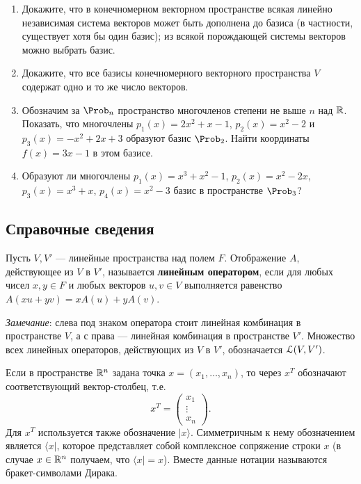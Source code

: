 \begin{enumerate}
\item Докажите, что в конечномерном векторном пространстве
\ipunkt всякая линейно независимая система векторов может быть дополнена до базиса (в частности,
существует хотя бы один базис);
\ipunkt из всякой порождающей системы векторов можно выбрать базис.

\item Докажите, что все базисы конечномерного векторного пространства $V$ содержат одно и
то же число векторов.

\item Обозначим за $\P_n$ пространство многочленов степени не выше $n$ над $\mathbb R$.  Показать, что многочлены $p_1(x)=2x^2+x-1$, $p_2(x)=x^2-2$ и $p_3(x)=-x^2+2x+3$ образуют базис $\P_2$. Найти координаты $f(x)=3x-1$ в этом базисе.

\item Образуют ли многочлены $p_1(x)=x^3+x^2-1$, $p_2(x)=x^2-2x$, $p_3(x)=x^3+x$, $p_4(x)=x^2-3$ базис в пространстве $\P_3$?

\end{enumerate}




\setcounter{chapter}{68}

\subsection*{Справочные сведения}

Пусть $V,V'$ --- линейные пространства над полем $F$.
Отображение $A$, действующее из $V$ в $V'$, называется \textbf{линейным оператором},
если для любых чисел $x,y\in F$ и любых векторов $u,v \in V$
выполняется равенство $A(xu + yv) = xA(u) + yA(v)$.

\textit{Замечание}: слева под знаком оператора стоит линейная комбинация в пространстве $V$, а с права --- линейная комбинация в пространстве $V'$. Множество всех линейных операторов, действующих из $V$ в $V'$, обозначается $\mathcal L(V,V')$.

Если в пространстве $\mathbb R^n$ задана точка $x=(x_1,\dots,x_n)$, то через $x^T$ обозначают соответствующий вектор-столбец, т.е.
$$
x^T=\begin{pmatrix}
x_1 \\ \vdots \\ x_n
\end{pmatrix}.
$$
Для $x^T$ используется также обозначение $|x\rangle$. Симметричным к нему обозначением является $\langle x|$, которое представляет собой комплексное сопряжение строки $x$ (в случае $x\in \mathbb R^n$ получаем, что $\langle x|=x$). Вместе данные нотации называются бракет-символами Дирака.



